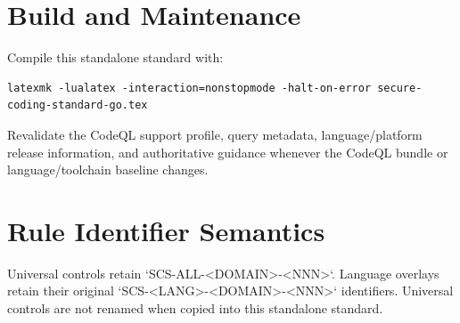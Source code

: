 \documentclass[10pt,letterpaper]{article}
\begin{document}
\appendix
\section{Build and Maintenance}
Compile this standalone standard with:
\begin{lstlisting}
latexmk -lualatex -interaction=nonstopmode -halt-on-error secure-coding-standard-go.tex
\end{lstlisting}
Revalidate the CodeQL support profile, query metadata, language/platform release information, and authoritative guidance whenever the CodeQL bundle or language/toolchain baseline changes.

\section{Rule Identifier Semantics}
Universal controls retain `SCS-ALL-<DOMAIN>-<NNN>`. Language overlays retain their original `SCS-<LANG>-<DOMAIN>-<NNN>` identifiers. Universal controls are not renamed when copied into this standalone standard.
\end{document}
